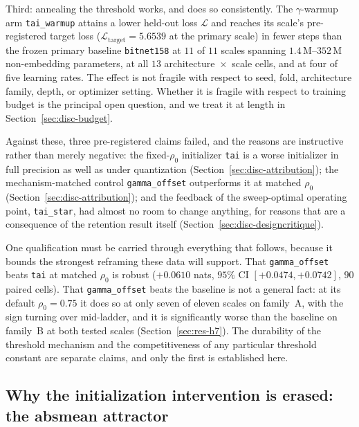 \documentclass[final,5p,times,twocolumn]{elsarticle}
\theoremstyle{remark}
\newcommand{\rhoz}{\rho_{0}}
\begin{document}
Third: annealing the threshold works, and does so consistently. The
$\gamma$-warmup arm \texttt{tai\_warmup} attains a lower held-out loss
$\mathcal{L}$ and reaches its scale's pre-registered target loss
($\mathcal{L}_{\mathrm{target}} = 5.6539$ at the primary scale) in fewer steps
than the frozen primary baseline \texttt{bitnet158} at $11$ of $11$ scales
spanning $1.4$\,M--$352$\,M non-embedding parameters, at all $13$
architecture~$\times$~scale cells, and at four of five learning rates. The
effect is not fragile with respect to seed, fold, architecture family, depth,
or optimizer setting. Whether it is fragile with respect to training
budget is the principal open question, and we treat it at length in
Section~\ref{sec:disc-budget}.

Against these, three pre-registered claims failed, and the reasons are
instructive rather than merely negative: the fixed-$\rhoz$ initializer
\texttt{tai} is a worse initializer in full precision as well as under
quantization (Section~\ref{sec:disc-attribution}); the mechanism-matched
control \texttt{gamma\_offset} outperforms it at matched $\rhoz$
(Section~\ref{sec:disc-attribution}); and the feedback of the sweep-optimal
operating point, \texttt{tai\_star}, had almost no room to change anything, for
reasons that are a consequence of the retention result itself
(Section~\ref{sec:disc-designcritique}).

One qualification must be carried through everything that follows, because it
bounds the strongest reframing these data will support. That
\texttt{gamma\_offset} beats \texttt{tai} at matched $\rhoz$ is robust
($+0.0610$ nats, $95\%$ CI $[+0.0474,+0.0742]$, $90$ paired cells). That
\texttt{gamma\_offset} beats the baseline is not a general fact: at its
default $\rhoz = 0.75$ it does so at only seven of eleven scales on family~A,
with the sign turning over mid-ladder, and it is significantly worse
than the baseline on family~B at both tested scales
(Section~\ref{sec:res-h7}). The durability of the threshold mechanism and the
competitiveness of any particular threshold constant are separate claims, and
only the first is established here.

\subsection{Why the initialization intervention is erased: the absmean
attractor}
\label{sec:disc-attractor}
\end{document}
